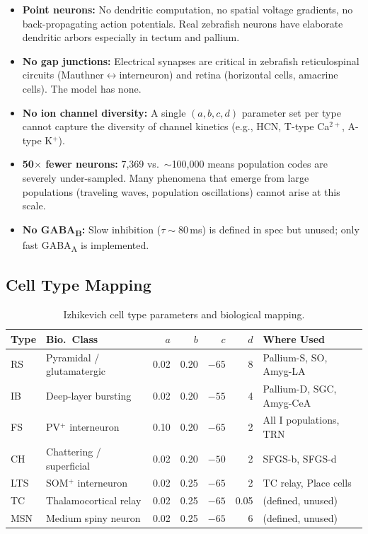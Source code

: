 \documentclass[11pt,a4paper]{article}
\begin{document}
\begin{itemize}[leftmargin=*]
\item \textbf{Point neurons:} No dendritic computation, no spatial voltage gradients,
  no back-propagating action potentials.  Real zebrafish neurons have elaborate
  dendritic arbors especially in tectum and pallium.
\item \textbf{No gap junctions:} Electrical synapses are critical in zebrafish
  reticulospinal circuits (Mauthner$\leftrightarrow$interneuron) and retina
  (horizontal cells, amacrine cells).  The model has none.
\item \textbf{No ion channel diversity:} A single $(a,b,c,d)$ parameter set per type
  cannot capture the diversity of channel kinetics (e.g., HCN, T-type Ca$^{2+}$,
  A-type K$^+$).
\item \textbf{50$\times$ fewer neurons:} 7,369 vs.\ $\sim$100,000 means population
  codes are severely under-sampled.  Many phenomena that emerge from large populations
  (traveling waves, population oscillations) cannot arise at this scale.
\item \textbf{No GABA\textsubscript{B}:} Slow inhibition ($\tau \sim 80$\,ms) is
  defined in spec but unused; only fast GABA\textsubscript{A} is implemented.
\end{itemize}

\subsection{Cell Type Mapping}

\begin{table}[H]
\centering
\caption{Izhikevich cell type parameters and biological mapping.}
\label{tab:celltypes}
\begin{tabular}{@{}llrrrrl@{}}
\toprule
\textbf{Type} & \textbf{Bio.\ Class} & $a$ & $b$ & $c$ & $d$ & \textbf{Where Used} \\
\midrule
RS  & Pyramidal / glutamatergic   & 0.02 & 0.20 & $-65$ & 8 & Pallium-S, SO, Amyg-LA \\
IB  & Deep-layer bursting         & 0.02 & 0.20 & $-55$ & 4 & Pallium-D, SGC, Amyg-CeA \\
FS  & PV$^+$ interneuron          & 0.10 & 0.20 & $-65$ & 2 & All I populations, TRN \\
CH  & Chattering / superficial    & 0.02 & 0.20 & $-50$ & 2 & SFGS-b, SFGS-d \\
LTS & SOM$^+$ interneuron         & 0.02 & 0.25 & $-65$ & 2 & TC relay, Place cells \\
TC  & Thalamocortical relay       & 0.02 & 0.25 & $-65$ & 0.05 & (defined, unused) \\
MSN & Medium spiny neuron         & 0.02 & 0.25 & $-65$ & 6 & (defined, unused) \\
\bottomrule
\end{tabular}
\end{table}
\end{document}
